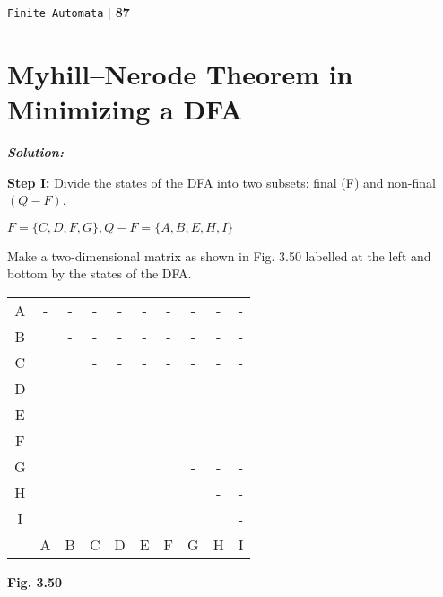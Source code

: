 \documentclass[8pt]{beamer}
\begin{document}
\begin{frame}
\begin{flushright}
 \texttt{Finite Automata} \hspace*{0.10cm}\textbf{$|$} \textbf{87}\hspace*{0.5cm}
\end{flushright}

\section*{Myhill–Nerode Theorem in Minimizing a DFA}

\vspace*{0.1cm}
\emph{
\textbf{Solution:}
}

\small{
\textbf{Step I:} Divide the states of the DFA into two subsets: final (F) and non-final $(Q-F)$.\\

\begin{center}
  $F = \{C, D, F, G\}, Q-F = \{A, B, E, H, I\}$\\
\end{center}

Make a two-dimensional matrix as shown in Fig. 3.50 labelled at the left and bottom by the states of
the DFA.\\

\pause

\begin{center}
\begin{tabular}{cccccccccc}
\hline
A& -& -& -& -& -& -& -& -& -\\
B&  & -& -& -& -& -& -& -& -\\
C&  &  & -& -& -& -& -& -& -\\
D&  &  &  & -& -& -& -& -& -\\
E&  &  &  &  & -& -& -& -& -\\
F&  &  &  &  &  & -& -& -& -\\
G&  &  &  &  &  &  & -& -& -\\
H&  &  &  &  &  &  &  & -& -\\
I&  &  &  &  &  &  &  &  & -\\
 &  A& B& C& D& E& F& G& H& I\\
 \hline

 \hline

 \hline

 \hline
\end{tabular}
\end{center}

\begin{center}
  \textbf{Fig. 3.50}\\
\end{center}
}

\vspace*{0.2cm}
\end{frame}
\end{document}
